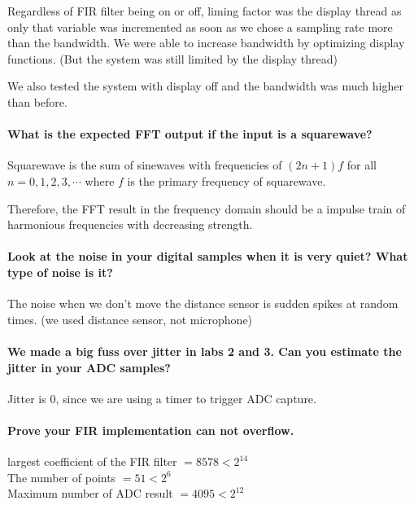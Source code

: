 \documentclass[a4paper]{article}
\begin{document}
Regardless of FIR filter being on or off, liming factor was the display thread as only that variable was incremented as soon as we chose a sampling rate more than the bandwidth. We were able to increase bandwidth by optimizing display functions. (But the system was still limited by the display thread)

We also tested the system with display off and the bandwidth was much higher than before.
 
\paragraph{What is the expected FFT output if the input is a squarewave?\\}
 
Squarewave is the sum of sinewaves with frequencies of $(2n+1)f$ for all $n = 0,1,2,3,\cdots$ where $f$ is the primary frequency of squarewave.

Therefore, the FFT result in the frequency domain should be a impulse train of harmonious frequencies with decreasing strength.
 
\paragraph{Look at the noise in your digital samples when it is very quiet? What type of noise is it? \\}

The noise when we don't move the distance sensor is sudden spikes at random times. (we used distance sensor, not microphone)
 
 \paragraph{We made a big fuss over jitter in labs 2 and 3. Can you estimate the jitter in your ADC samples? \\}
 
 Jitter is 0, since we are using a timer to trigger ADC capture.
 
\paragraph{Prove your FIR implementation can not overflow. \\}

 largest coefficient of the FIR filter $ = 8578 < 2^14$ \\
 The number of points $ = 51 < 2^6 $ \\
 Maximum number of ADC result $ = 4095 < 2^12 $ \\
 
\end{document}
